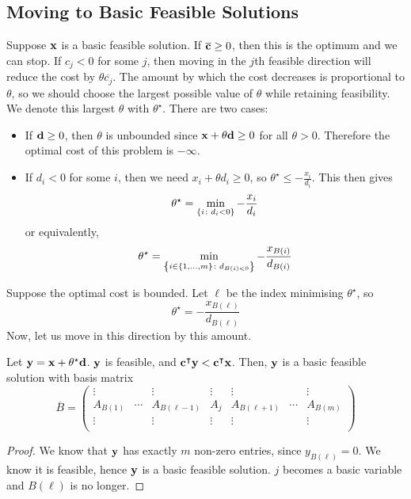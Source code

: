 \subsection{Moving to Basic Feasible Solutions}
Suppose \( \vb x \) is a basic feasible solution. If \( \overline{\vb c} \geq 0 \), then this is the optimum and we can stop.
If \( c_j < 0 \) for some \( j \), then moving in the \( j \)th feasible direction will reduce the cost by \( \theta \overline{c_j} \).
The amount by which the cost decreases is proportional to \( \theta \), so we should choose the largest possible value of \( \theta \) while retaining feasibility.
We denote this largest \( \theta \) with \( \theta^\star \). There are two cases:
\begin{itemize}
    \item If \( \vb d \geq 0 \), then \( \theta \) is unbounded since \( \vb x + \theta \vb d \geq 0 \) for all \( \theta > 0 \).
    Therefore the optimal cost of this problem is \( -\infty \).
    \item If \( d_i < 0 \) for some \( i \), then we need \( x_i + \theta d_i \geq 0 \), so \( \theta^\star \leq -\frac{x_i}{d_i} \).
    This then gives
    \[ \theta^\star = \min_{\qty{i \colon d_i < 0}} -\frac{x_i}{d_i} \]
    or equivalently,
    \[ \theta^\star = \min_{\qty{i \in \qty{1,\dots,m} \colon d_{B(i) < 0}}} -\frac{x_{B(i)}}{d_{B(i)}} \]
\end{itemize}
Suppose the optimal cost is bounded. Let \( \ell \) be the index minimising \( \theta^\star \), so
\[ \theta^\star = -\frac{x_{B(\ell)}}{d_{B(\ell)}} \]
Now, let us move in this direction by this amount.
\begin{theorem}
    Let \( \vb y = \vb x + \theta^\star \vb d \). \( \vb y \) is feasible, and \( \vb c^\intercal \vb y < \vb c^\intercal \vb x \).
    Then, \( \vb y \) is a basic feasible solution with basis matrix
    \[ \overline{B} = \begin{pmatrix}
        \vdots & & \vdots & \vdots & \vdots & & \vdots \\
        A_{B(1)} & \cdots & A_{B(\ell-1)} & A_{j} & A_{B(\ell+1)} & \cdots & A_{B(m)} \\
        \vdots & & \vdots & \vdots & \vdots & & \vdots \\
    \end{pmatrix} \]
\end{theorem}
\begin{proof}
    We know that \( \vb y \) has exactly \( m \) non-zero entries, since \( y_{B(\ell)} = 0 \). We know it is feasible, hence \( \vb y \) is a basic feasible solution.
    \( j \) becomes a basic variable and \( B(\ell) \) is no longer.
\end{proof}

